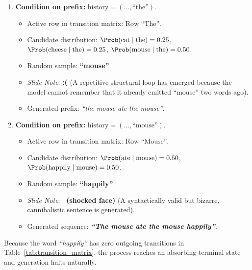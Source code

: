 \documentclass[../../main.tex]{subfiles}
\begin{document}
\begin{enumerate}[label=\textbf{Step \arabic*:}, leftmargin=2.0cm]
    \item \textbf{Condition on prefix:} $\text{history} = (\dots, \text{``the''})$.
    \begin{itemize}
        \item Active row in transition matrix: $\text{Row ``The''}$.
        \item Candidate distribution: $\Prob(\text{cat}\mid\text{the}) = 0.25$, $\Prob(\text{cheese}\mid\text{the}) = 0.25$, $\Prob(\text{mouse}\mid\text{the}) = 0.50$.
        \item Random sample: \textbf{``mouse''}.
        \item \emph{Slide Note}: \textcolor{examAmber}{\textbf{:(}} (A repetitive structural loop has emerged because the model cannot remember that it already emitted ``mouse'' two words ago).
        \item Generated prefix: \textit{``the mouse ate the mouse''}.
    \end{itemize}

    \item \textbf{Condition on prefix:} $\text{history} = (\dots, \text{``mouse''})$.
    \begin{itemize}
        \item Active row in transition matrix: $\text{Row ``Mouse''}$.
        \item Candidate distribution: $\Prob(\text{ate}\mid\text{mouse}) = 0.50$, $\Prob(\text{happily}\mid\text{mouse}) = 0.50$.
        \item Random sample: \textbf{``happily''}.
        \item \emph{Slide Note}: \textcolor{examAmber}{\textbf{\faSurprise\ (shocked face)}} (A syntactically valid but bizarre, cannibalistic sentence is generated).
        \item Generated sequence: \textbf{\textit{``The mouse ate the mouse happily''}}.
    \end{itemize}
\end{enumerate}

Because the word \textit{``happily''} has zero outgoing transitions in Table~\ref{tab:transition_matrix}, the process reaches an absorbing terminal state and generation halts naturally.
\end{document}
